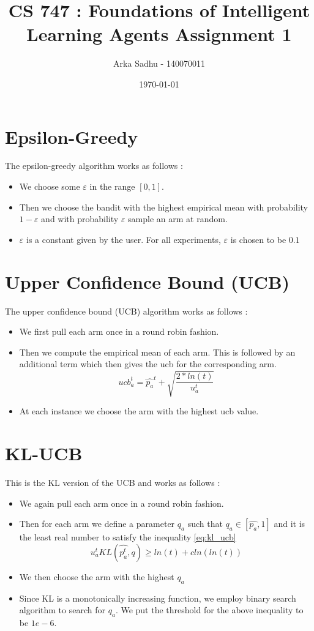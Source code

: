 \documentclass{article}
\title{CS 747 : Foundations of Intelligent Learning Agents Assignment 1}
\author{Arka Sadhu - 140070011}
\date{\today}
\begin{document}
\maketitle

\section{Epsilon-Greedy}
The epsilon-greedy algorithm works as follows :
\begin{itemize}
\item We choose some $\varepsilon$ in the range $[0,1]$.
\item Then we choose the bandit with the highest empirical mean with probability $1 - \varepsilon$ and with probability $\varepsilon$ sample an arm at random.
\item $\varepsilon$ is a constant given by the user. For all experiments, $\varepsilon$ is chosen to be $0.1$
\end{itemize}

\section{Upper Confidence Bound (UCB)}
The upper confidence bound (UCB) algorithm works as follows :
\begin{itemize}
\item We first pull each arm once in a round robin fashion.
\item Then we compute the empirical mean of each arm. This is followed by an additional term which then gives the ucb for the corresponding arm.
  $$ ucb_a^t = \hat{p_a}^t + \sqrt{\frac{2 * ln(t)}{u_a^{t}}}$$
\item At each instance we choose the arm with the highest ucb value.
\end{itemize}

\section{KL-UCB}
This is the KL version of the UCB and works as follows :
\begin{itemize}
\item We again pull each arm once in a round robin fashion.
\item Then for each arm we define a parameter $q_a$ such that $q_a \in [\hat{p_a},1]$ and it is the least real number to satisfy the inequality \ref{eq:kl_ucb}
  \begin{equation}
    \label{eq:kl_ucb}
    u_a^t KL(\hat{p_a^t}, q) \ge ln(t) + cln(ln(t))
  \end{equation}
\item We then choose the arm with the highest $q_a$
\item Since KL is a monotonically increasing function, we employ binary search algorithm to search for $q_a$. We put the threshold for the above inequality to be $1e-6$.
\end{itemize}
\end{document}
